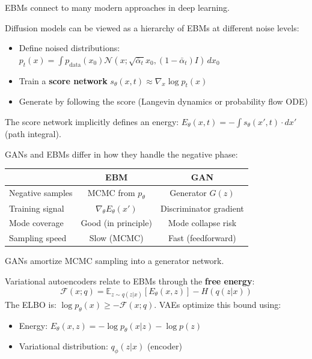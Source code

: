 EBMs connect to many modern approaches in deep learning.

\begin{remark}
    Diffusion models can be viewed as a hierarchy of EBMs at different noise levels:
    \begin{itemize}
        \item Define noised distributions: $p_t(x) = \int p_{\text{data}}(x_0) \mathcal{N}(x; \sqrt{\bar{\alpha}_t} x_0, (1-\bar{\alpha}_t)I) \, dx_0$
        \item Train a \textbf{score network} $s_\theta(x, t) \approx \nabla_x \log p_t(x)$
        \item Generate by following the score (Langevin dynamics or probability flow ODE)
    \end{itemize}
    The score network implicitly defines an energy: $E_\theta(x, t) = -\int s_\theta(x', t) \cdot dx'$ (path integral).
\end{remark}

\begin{remark}
    GANs and EBMs differ in how they handle the negative phase:
    \begin{center}
    \begin{tabular}{lcc}
        \hline
        & \textbf{EBM} & \textbf{GAN} \\
        \hline
        Negative samples & MCMC from $p_\theta$ & Generator $G(z)$ \\
        Training signal & $\nabla_\theta E_\theta(x')$ & Discriminator gradient \\
        Mode coverage & Good (in principle) & Mode collapse risk \\
        Sampling speed & Slow (MCMC) & Fast (feedforward) \\
        \hline
    \end{tabular}
    \end{center}
    GANs amortize MCMC sampling into a generator network.
\end{remark}

\begin{remark}
    Variational autoencoders relate to EBMs through the \textbf{free energy}:
    \[
        \mathcal{F}(x; q) = \mathbb{E}_{z \sim q(z|x)}[E_\theta(x, z)] - H(q(z|x))
    \]
    The ELBO is: $\log p_\theta(x) \geq -\mathcal{F}(x; q)$. VAEs optimize this bound using:
    \begin{itemize}
        \item Energy: $E_\theta(x, z) = -\log p_\theta(x|z) - \log p(z)$
        \item Variational distribution: $q_\phi(z|x)$ (encoder)
    \end{itemize}
\end{remark}

